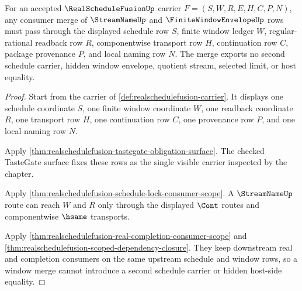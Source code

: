 \begin{theorem}
\label{thm:realschedulefusion-window-merge-scope}
For an accepted $\RealScheduleFusionUp$ carrier $F=(S,W,R,E,H,C,P,N)$, any consumer merge of $\StreamNameUp$ and $\FiniteWindowEnvelopeUp$ rows must pass through the displayed schedule row $S$, finite window ledger $W$, regular-rational readback row $R$, componentwise transport row $H$, continuation row $C$, package provenance $P$, and local naming row $N$. The merge exports no second schedule carrier, hidden window envelope, quotient stream, selected limit, or host equality.
\end{theorem}
\begin{proof}
Start from the carrier of \autoref{def:realschedulefusion-carrier}. It displays one schedule coordinate $S$, one finite window coordinate $W$, one readback coordinate $R$, one transport row $H$, one continuation row $C$, one provenance row $P$, and one local naming row $N$.

Apply \autoref{thm:realschedulefusion-tastegate-obligation-surface}. The checked TasteGate surface fixes these rows as the single visible carrier inspected by the chapter.

Apply \autoref{thm:realschedulefusion-schedule-lock-consumer-scope}. A $\StreamNameUp$ route can reach $W$ and $R$ only through the displayed $\Cont$ routes and componentwise $\hsame$ transports.

Apply \autoref{thm:realschedulefusion-real-completion-consumer-scope} and \autoref{thm:realschedulefusion-scoped-dependency-closure}. They keep downstream real and completion consumers on the same upstream schedule and window rows, so a window merge cannot introduce a second schedule carrier or hidden host-side equality.
\end{proof}

